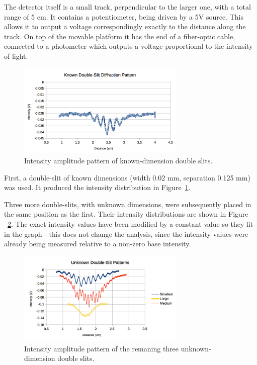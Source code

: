 \documentclass[journal]{IEEEtran}
\begin{document}
The detector itself is a small track, perpendicular to the larger one, with a
total range of 5 cm. It contains a potentiometer, being driven by a 5V source.
This allows it to output a voltage correspondingly exactly to the distance
along the track. On top of the movable platform it has the end of a fiber-optic
cable, connected to a photometer which outputs a voltage proportional to the
intensity of light.

\begin{figure}[ht!]
\centering
\includegraphics[width=80mm]{known.png}
\caption{Intensity amplitude pattern of known-dimension double slits.}
\label{known}
\end{figure}


First, a double-slit of known dimensions (width 0.02 mm, separation 0.125 mm)
was used. It produced the intensity distribution in Figure~\ref{known}.

Three more double-slits, with unknown dimensions, were subsequently placed in
the same position as the first. Their intensity distributions are shown in
Figure ~\ref{unknown}. The exact intensity values have been modified by a
constant value so they fit in the graph - this does not change the analysis,
since the intensity values were already being measured relative to a non-zero
base intensity.

\begin{figure}[ht!]
\centering
\includegraphics[width=80mm]{unknown.png}
\caption{Intensity amplitude pattern of the remaning three unknown-dimension
double slits.}
\label{unknown}
\end{figure}
\end{document}
